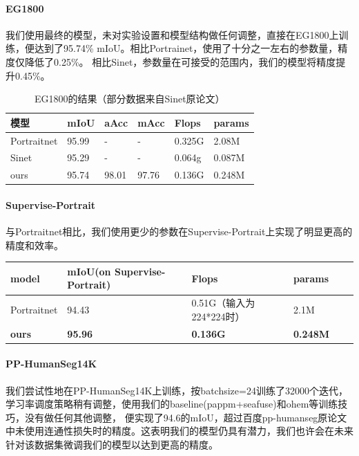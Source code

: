 \documentclass[11pt]{article}
\begin{document}
\paragraph{EG1800}
我们使用最终的模型，未对实验设置和模型结构做任何调整，直接在EG1800上训练，便达到了95.74\% mIoU。相比Portrainet，使用了十分之一左右的参数量，精度仅降低了0.25\%。
相比Sinet，参数量在可接受的范围内，我们的模型将精度提升0.45\%。
\begin{table}[H]
  \centering
  \begin{tabular}{|l|l|l|l|l|l|}
  \hline
      模型 & mIoU & aAcc & mAcc & Flops & params \\ \hline
      Portraitnet & 95.99 & - & - & 0.325G & 2.08M \\ \hline
      Sinet & 95.29 & - & - & 0.064g & 0.087M \\ \hline
      ours & 95.74 & 98.01 & 97.76 & 0.136G & 0.248M \\ \hline
  \end{tabular}
  \caption{EG1800的结果（部分数据来自Sinet原论文）}
\end{table}

\paragraph{Supervise-Portrait}


与Portraitnet相比，我们使用更少的参数在Supervise-Portrait上实现了明显更高的精度和效率。

\begin{table}[H]
  \centering
  \begin{tabular}{|l|l|l|l|l|l|}
  \hline
      model & mIoU(on Supervise-Portrait) & Flops & params \\ \hline
      Portraitnet&94.43& 0.51G（输入为224*224时）&2.1M\\\hline
      \textbf{ours}&\textbf{95.96}&\textbf{0.136G}&\textbf{0.248M}\\\hline
  \end{tabular}
\end{table}

\paragraph{PP-HumanSeg14K}
我们尝试性地在PP-HumanSeg14K上训练，按batchsize=24训练了32000个迭代，学习率调度策略稍有调整，使用我们的baseline(pappm+seafuse)和ohem等训练技巧，没有做任何其他调整，
便实现了94.6的mIoU，超过百度pp-humanseg原论文中未使用连通性损失时的精度。这表明我们的模型仍具有潜力，我们也许会在未来针对该数据集微调我们的模型以达到更高的精度。
\end{document}
